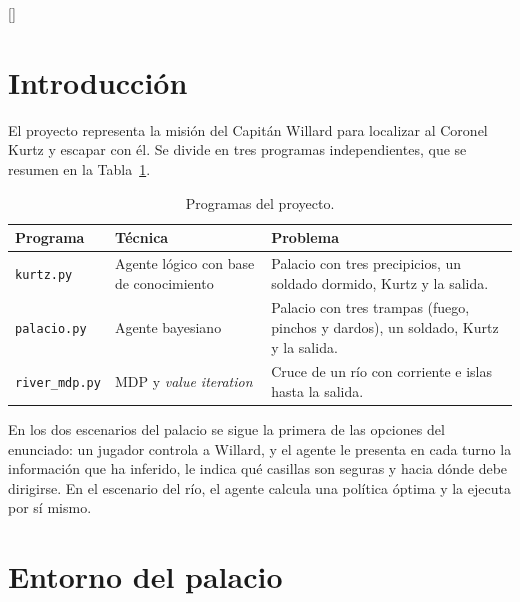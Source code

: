 \documentclass[11pt,a4paper]{article}
\newcommand{\sectionbreak}{\Needspace{10\baselineskip}}
\newcommand{\code}[1]{\texttt{#1}}
\begin{document}
\begingroup
\renewcommand{\sectionbreak}{}
\titleformat{\section}{\sffamily\LARGE\bfseries\color{verde}}{}{0pt}{}[\vspace{2pt}{\color{lineagris}\titlerule[0.8pt]}]
\tableofcontents
\endgroup
\clearpage

\section{Introducción}

El proyecto representa la misión del Capitán Willard para localizar al Coronel Kurtz y escapar con él. Se divide en tres programas independientes, que se resumen en la Tabla~\ref{tab:programas}.

\begin{table}[H]
\centering\small
\caption{Programas del proyecto.}\label{tab:programas}
\begin{tabularx}{\linewidth}{@{}l>{\raggedright\arraybackslash}p{3.6cm}X@{}}
\toprule
\textbf{Programa} & \textbf{Técnica} & \textbf{Problema}\\
\midrule
\code{kurtz.py} & Agente lógico con base de conocimiento & Palacio con tres precipicios, un soldado dormido, Kurtz y la salida.\\
\code{palacio.py} & Agente bayesiano & Palacio con tres trampas (fuego, pinchos y dardos), un soldado, Kurtz y la salida.\\
\code{river\_mdp.py} & MDP y \emph{value iteration} & Cruce de un río con corriente e islas hasta la salida.\\
\bottomrule
\end{tabularx}
\end{table}

En los dos escenarios del palacio se sigue la primera de las opciones del enunciado: un jugador controla a Willard, y el agente le presenta en cada turno la información que ha inferido, le indica qué casillas son seguras y hacia dónde debe dirigirse. En el escenario del río, el agente calcula una política óptima y la ejecuta por sí mismo.

\section{Entorno del palacio}
\end{document}
